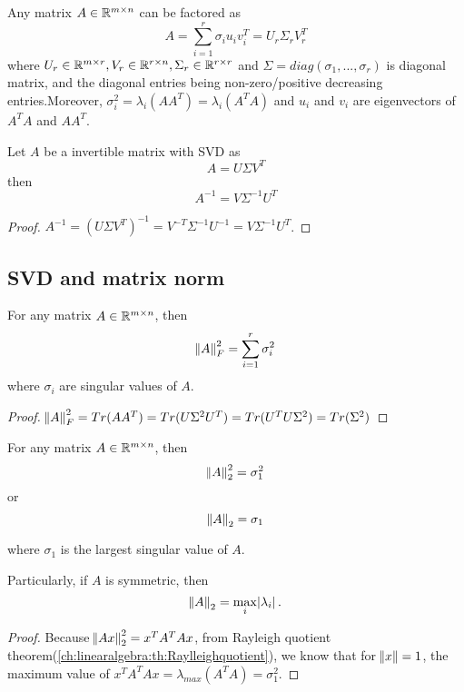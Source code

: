 \begin{refsection}
\begin{corollary}
\cite[146]{calafiore2014optimization}Any matrix $A \in \mathbb{R}^{m\times n}$ can be factored as
$$A = \sum_{i=1}^r \sigma_i u_i v_i^T = U_r\Sigma_r V^T_r$$
where $U_r\in \mathbb{R}^{m\times r}, V_r\in \mathbb{R}^{r\times n}, \Sigma_r \in \mathbb{R}^{r\times r}$ and $\Sigma = diag(\sigma_1,...,\sigma_r)$ is diagonal matrix, and the diagonal entries being non-zero/positive decreasing entries.Moreover, $\sigma_i^2 = \lambda_i(AA^T) = \lambda_i(A^TA)$ and $u_i$ and $v_i$ are eigenvectors of $A^TA$ and $AA^T$.
\end{corollary}


\begin{lemma}
Let $A$ be a invertible matrix with SVD as
$$A = U\Sigma V^T$$
then
$$A^{-1} = V\Sigma^{-1}U^T$$
\end{lemma}
\begin{proof}
$A^{-1} = (U\Sigma V^T)^{-1} = V^{-T}\Sigma^{-1}U^{-1} = V\Sigma^{-1}U^T$.
\end{proof}






\subsection{SVD and matrix norm}
\begin{theorem}\label{ch:linearalgebra:th:matrixFrobniusnormsingularvalueeigenvalue}
For any matrix $A\in \mathbb{R}^{m\times n}$, then
$$\norm{A}_F^2 = \sum_{i=1}^r \sigma^2_i$$
where $\sigma_i$ are singular values of $A$.
\end{theorem}
\begin{proof}
$\norm{A}_F^2 = Tr(AA^T) = Tr(U\Sigma^2 U^T) = Tr(U^TU \Sigma^2) = Tr(\Sigma^2)$
\end{proof}


\begin{theorem}\label{ch:linearalgebra:th:matrix2normsingularvalueeigenvalue}
For any matrix $A\in \mathbb{R}^{m\times n}$, then
$$\norm{A}_2^2 =  \sigma^2_1$$
or $$\norm{A}_2 =  \sigma_1$$

where $\sigma_1$ is the largest singular value of $A$.

Particularly, if $A$ is symmetric, then 
$$\norm{A}_2 = \max_{i} \abs{\lambda_i}.$$
\end{theorem}

\begin{proof}
Because $\norm{Ax}_2^2 = x^TA^TAx$, from Rayleigh quotient theorem(\autoref{ch:linearalgebra:th:Raylleighquotient}), we know that for $\norm{x}=1$, the maximum value of $x^TA^TAx = \lambda_{max}(A^TA) = \sigma_1^2$.
\end{proof}




\end{refsection}
